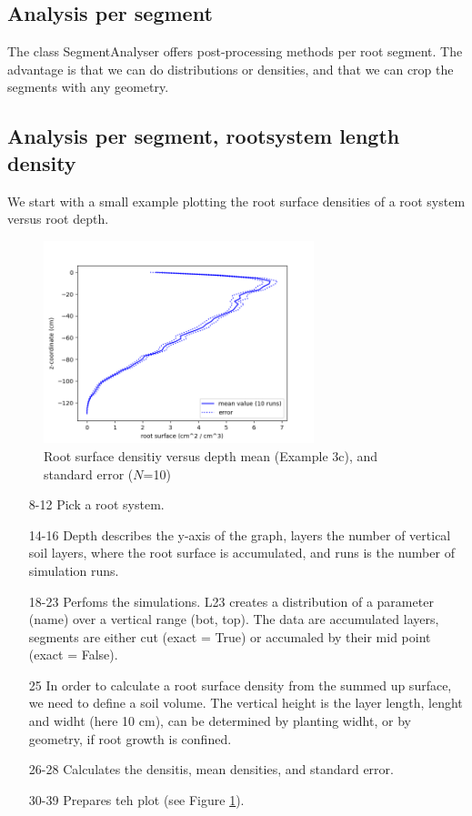 \documentclass[a4paper]{article}
\begin{document}
\subsection{Analysis per segment}

The class SegmentAnalyser offers post-processing methods per root segment. The advantage is that we can do distributions or densities, and that we can crop the segments with any geometry. 


\subsection{Analysis per segment, rootsystem length density}

We start with a small example plotting the root surface densities of a root system versus root depth.



\begin{figure}
\centering
\includegraphics[width=0.7\textwidth]{example_3c.png}
\caption{Root surface densitiy versus depth mean (Example 3c), and standard error ($N$=10)} \label{fig:surface_density}
\end{figure}


\begin{itemize}

\item[8-12] Pick a root system.
\item[14-16] Depth describes the y-axis of the graph, layers the number of vertical soil layers, where the root surface is accumulated, and runs is the number of simulation runs. 
\item[18-23] Perfoms the simulations. L23 creates a distribution of a parameter (name) over a vertical range (bot, top). The data are accumulated layers, segments are either cut (exact = True) or accumaled by their mid point (exact = False). 
\item[25] In order to calculate a root surface density from the summed up surface, we need to define a soil volume. The vertical height is the layer length, lenght and widht (here 10 cm), can be determined by planting widht, or by geometry, if root growth is confined. 
\item[26-28] Calculates the densitis, mean densities, and standard error. 
\item[30-39] Prepares teh plot (see Figure \ref{fig:surface_density}).

\end{itemize}
\end{document}
